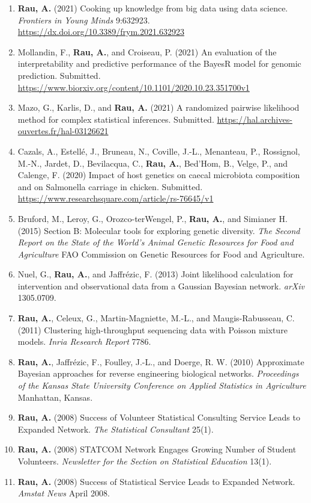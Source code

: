 \documentclass[11pt, a4paper]{awesome-cv}
\providecommand{\tightlist}{%
	\setlength{\itemsep}{0pt}\setlength{\parskip}{0pt}}
\begin{document}
\begin{enumerate}
\def\labelenumi{\arabic{enumi}.}
\tightlist
\item
  \textbf{Rau, A.} (2021) Cooking up knowledge from big data using data
  science. \emph{Frontiers in Young Minds} 9:632923.
  \url{https://dx.doi.org/10.3389/frym.2021.632923}
\item
  Mollandin, F., \textbf{Rau, A.}, and Croiseau, P. (2021) An evaluation
  of the interpretability and predictive performance of the BayesR model
  for genomic prediction. Submitted.
  \url{https://www.biorxiv.org/content/10.1101/2020.10.23.351700v1}
\item
  Mazo, G., Karlis, D., and \textbf{Rau, A.} (2021) A randomized
  pairwise likelihood method for complex statistical inferences.
  Submitted. \url{https://hal.archives-ouvertes.fr/hal-03126621}
\item
  Cazals, A., Estellé, J., Bruneau, N., Coville, J.-L., Menanteau, P.,
  Rossignol, M.-N., Jardet, D., Bevilacqua, C., \textbf{Rau, A.},
  Bed'Hom, B., Velge, P., and Calenge, F. (2020) Impact of host genetics
  on caecal microbiota composition and on Salmonella carriage in
  chicken. Submitted.
  \url{https://www.researchsquare.com/article/rs-76645/v1}
\item
  Bruford, M., Leroy, G., Orozco-terWengel, P., \textbf{Rau, A.}, and
  Simianer H. (2015) Section B: Molecular tools for exploring genetic
  diversity. \emph{The Second Report on the State of the World's Animal
  Genetic Resources for Food and Agriculture} FAO Commission on Genetic
  Resources for Food and Agriculture.
\item
  Nuel, G., \textbf{Rau, A.}, and Jaffrézic, F. (2013) Joint likelihood
  calculation for intervention and observational data from a Gaussian
  Bayesian network. \emph{arXiv} 1305.0709.
\item
  \textbf{Rau, A.}, Celeux, G., Martin-Magniette, M.-L., and
  Maugis-Rabusseau, C. (2011) Clustering high-throughput sequencing data
  with Poisson mixture models. \emph{Inria Research Report} 7786.
\item
  \textbf{Rau, A.}, Jaffrézic, F., Foulley, J.-L., and Doerge, R. W.
  (2010) Approximate Bayesian approaches for reverse engineering
  biological networks. \emph{Proceedings of the Kansas State University
  Conference on Applied Statistics in Agriculture} Manhattan, Kansas.
\item
  \textbf{Rau, A.} (2008) Success of Volunteer Statistical Consulting
  Service Leads to Expanded Network. \emph{The Statistical Consultant}
  25(1).
\item
  \textbf{Rau, A.} (2008) STATCOM Network Engages Growing Number of
  Student Volunteers. \emph{Newsletter for the Section on Statistical
  Education} 13(1).
\item
  \textbf{Rau, A.} (2008) Success of Statistical Service Leads to
  Expanded Network. \emph{Amstat News} April 2008.
\end{enumerate}
\end{document}

